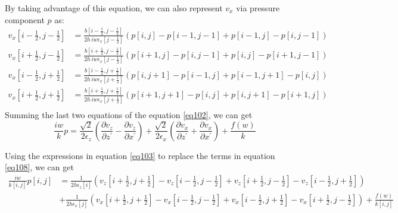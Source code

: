 \documentclass[revised,endfloat]{geophysics}
\begin{document}
By taking advantage of this equation, we can also represent $v_x$ via pressure component $p$ as:
\begin{equation}
\begin{split}
v_x[i-\frac{1}{2}, j-\frac{1}{2}] &= \frac{b[i-\frac{1}{2}, j-\frac{1}{2}]}{2h\, iw \epsilon_x[j-\frac{1}{2}]} \left(p[i,j] - p[i-1,j-1] + p[i-1,j] - p[i,j-1] \right) \\
v_x[i+\frac{1}{2}, j-\frac{1}{2}] &= \frac{b[i+\frac{1}{2}, j-\frac{1}{2}]}{2h\, iw \epsilon_x[j-\frac{1}{2}]} \left(p[i+1,j] - p[i,j-1] + p[i,j] - p[i+1,j-1] \right) \\
v_x[i-\frac{1}{2}, j+\frac{1}{2}] &= \frac{b[i-\frac{1}{2}, j+\frac{1}{2}]}{2h\, iw \epsilon_x[j+\frac{1}{2}]} \left(p[i,j+1] - p[i-1,j] + p[i-1,j+1] - p[i,j] \right) \\
v_x[i+\frac{1}{2}, j+\frac{1}{2}] &= \frac{b[i+\frac{1}{2}, j+\frac{1}{2}]}{2h\, iw \epsilon_x[j+\frac{1}{2}]} \left(p[i+1,j+1] - p[i,j] + p[i,j+1] - p[i+1,j] \right) \\
\end{split} 
\label{eq107}
\end{equation}
Summing the last two equations of the equation \ref{eq102}, we can get
\begin{equation}
\frac{iw}{k} p = \frac{\sqrt{2}}{2\epsilon_z} \left( \frac{\partial v_z}{\partial z^{\prime}} - \frac{\partial v_z}{\partial x^{\prime}} \right) + \frac{\sqrt{2}}{2\epsilon_x} \left( \frac{\partial v_x}{\partial z^{\prime}} + \frac{\partial v_x}{\partial x^{\prime}} \right) + \frac{f(w)}{k} 
\label{e108}
\end{equation}

Using the expressions in equation \ref{eq103}  to replace the terms in equation \ref{eq108}, we can get
\begin{equation}
\begin{split}
\frac{iw}{k[i,j]}p[i,j] & = \frac{1}{2h \epsilon_z[i]} \left( v_z[i+\frac{1}{2}, j+\frac{1}{2}] - v_z[i-\frac{1}{2},j-\frac{1}{2}] + v_z[i+\frac{1}{2}, j-\frac{1}{2}] - v_z[i-\frac{1}{2}, j+\frac{1}{2}] \right) \\
&+ \frac{1}{2h \epsilon_x[j]} \left(v_x[i+\frac{1}{2},j+\frac{1}{2}]- v_x[i-\frac{1}{2},j-\frac{1}{2}] + v_x[i-\frac{1}{2},j+\frac{1}{2}] - v_x[i+\frac{1}{2},j-\frac{1}{2}]\right) + \frac{f(w)}{k[i,j]} 
\end{split}
\label{eq109}
\end{equation}
\end{document}
